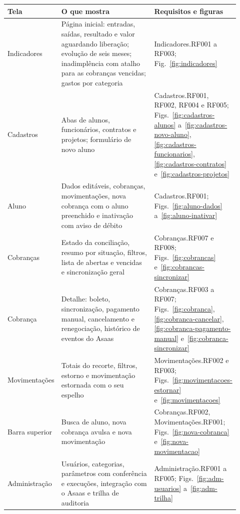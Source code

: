 \documentclass[11pt,a4paper,oneside]{report}
\begin{document}
\begin{longtable}{@{}p{0.2\linewidth} p{0.46\linewidth} >{\raggedright\arraybackslash}p{0.26\linewidth}@{}}
  \toprule
  \textbf{Tela} & \textbf{O que mostra} & \textbf{Requisitos e figuras} \\
  \midrule
  \endhead
  Indicadores & Página inicial: entradas, saídas, resultado e valor aguardando liberação; evolução
                de seis meses; inadimplência com atalho para as cobranças vencidas; gastos por
                categoria &
                Indicadores.RF001 a RF003; Fig.~\ref{fig:indicadores} \\
  Cadastros & Abas de alunos, funcionários, contratos e projetos; formulário de novo aluno &
              Cadastros.RF001, RF002, RF004 e RF005; Figs.~\ref{fig:cadastros-alunos}
              a~\ref{fig:cadastros-novo-aluno}, \ref{fig:cadastros-funcionarios},
              \ref{fig:cadastros-contratos} e~\ref{fig:cadastros-projetos} \\
  Aluno & Dados editáveis, cobranças, movimentações, nova cobrança com o aluno preenchido e
          inativação com aviso de débito & Cadastros.RF001; Figs.~\ref{fig:aluno-dados}
          a~\ref{fig:aluno-inativar} \\
  Cobranças & Estado da conciliação, resumo por situação, filtros, lista de abertas e vencidas e
              sincronização geral & Cobranças.RF007 e RF008; Figs.~\ref{fig:cobrancas}
              e~\ref{fig:cobrancas-sincronizar} \\
  Cobrança & Detalhe: boleto, sincronização, pagamento manual, cancelamento e
             renegociação, histórico de eventos do Asaas & Cobranças.RF003 a RF007;
             Figs.~\ref{fig:cobranca}, \ref{fig:cobranca-cancelar},
             \ref{fig:cobranca-pagamento-manual} e~\ref{fig:cobranca-sincronizar} \\
  Movimentações & Totais do recorte, filtros, estorno e movimentação estornada com o seu espelho &
                  Movimentações.RF002 e RF003; Figs.~\ref{fig:movimentacoes-estornar}
                  e~\ref{fig:movimentacoes} \\
  Barra superior & Busca de aluno, nova cobrança avulsa e nova movimentação & Cobranças.RF002,
                   Movimentações.RF001; Figs.~\ref{fig:nova-cobranca}
                   e~\ref{fig:nova-movimentacao} \\
  Administração & Usuários, categorias, parâmetros com conferência e execuções, integração com o
                  Asaas e trilha de auditoria & Administração.RF001 a RF005;
                  Figs.~\ref{fig:adm-usuarios} a~\ref{fig:adm-trilha} \\
  \bottomrule
\end{longtable}
\end{document}

